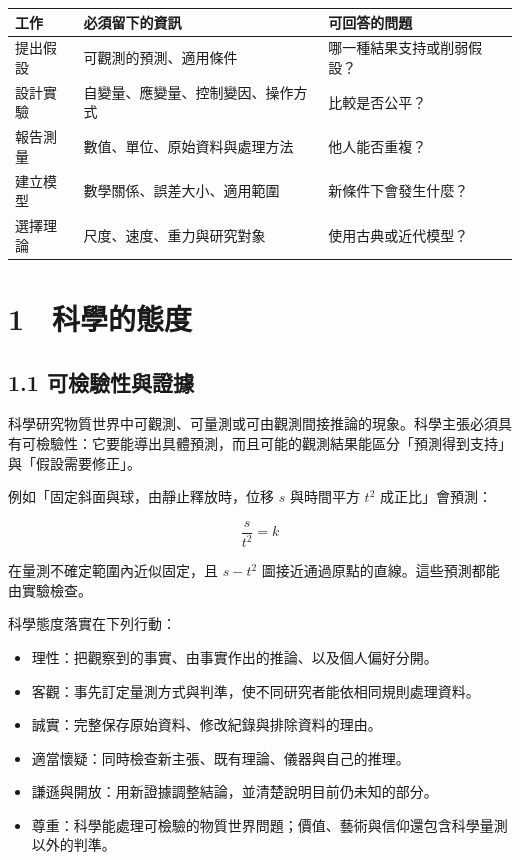 \documentclass[11pt,a4paper]{article}
\newcounter{none}
\providecommand{\tightlist}{%
  \setlength{\itemsep}{0pt}\setlength{\parskip}{0pt}}
\begin{document}
{\def\LTcaptype{none} %
\begin{longtable}[]{@{}lll@{}}
\toprule\noalign{}
工作 & 必須留下的資訊 & 可回答的問題 \\
\midrule\noalign{}
\endhead
\bottomrule\noalign{}
\endlastfoot
提出假設 & 可觀測的預測、適用條件 & 哪一種結果支持或削弱假設？ \\
設計實驗 & 自變量、應變量、控制變因、操作方式 & 比較是否公平？ \\
報告測量 & 數值、單位、原始資料與處理方法 & 他人能否重複？ \\
建立模型 & 數學關係、誤差大小、適用範圍 & 新條件下會發生什麼？ \\
選擇理論 & 尺度、速度、重力與研究對象 & 使用古典或近代模型？ \\
\end{longtable}
}

\section{1　科學的態度}\label{ux79d1ux5b78ux7684ux614bux5ea6}

\subsection{1.1 可檢驗性與證據}\label{ux53efux6aa2ux9a57ux6027ux8207ux8b49ux64da}

科學研究物質世界中可觀測、可量測或可由觀測間接推論的現象。科學主張必須具有可檢驗性：它要能導出具體預測，而且可能的觀測結果能區分「預測得到支持」與「假設需要修正」。

例如「固定斜面與球，由靜止釋放時，位移 \(s\) 與時間平方 \(t^2\) 成正比」會預測：

\[
\frac{s}{t^2}=k
\]

在量測不確定範圍內近似固定，且 \(s-t^2\) 圖接近通過原點的直線。這些預測都能由實驗檢查。

科學態度落實在下列行動：

\begin{itemize}
\tightlist
\item
  理性：把觀察到的事實、由事實作出的推論、以及個人偏好分開。
\item
  客觀：事先訂定量測方式與判準，使不同研究者能依相同規則處理資料。
\item
  誠實：完整保存原始資料、修改紀錄與排除資料的理由。
\item
  適當懷疑：同時檢查新主張、既有理論、儀器與自己的推理。
\item
  謙遜與開放：用新證據調整結論，並清楚說明目前仍未知的部分。
\item
  尊重：科學能處理可檢驗的物質世界問題；價值、藝術與信仰還包含科學量測以外的判準。
\end{itemize}
\end{document}
